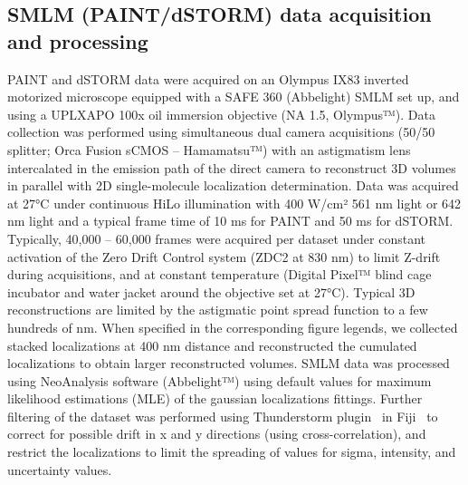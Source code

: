 \subsection{SMLM (PAINT/dSTORM) data acquisition and processing}

PAINT and dSTORM data were acquired on an Olympus IX83 inverted motorized microscope equipped with a SAFE 360 (Abbelight) SMLM set up, and using a UPLXAPO 100x oil immersion objective (NA 1.5, Olympus™).
Data collection was performed using simultaneous dual camera acquisitions (50/50 splitter; Orca Fusion sCMOS -- Hamamatsu™) with an astigmatism lens intercalated in the emission path of the direct camera to reconstruct 3D volumes in parallel with 2D single-molecule localization determination.
Data was acquired at 27°C under continuous HiLo illumination with 400 W/cm² 561 nm light or 642 nm light and a typical frame time of 10 ms for PAINT and 50 ms for dSTORM.
Typically, 40,000 -- 60,000 frames were acquired per dataset under constant activation of the Zero Drift Control system (ZDC2 at 830 nm) to limit Z-drift during acquisitions, and at constant temperature (Digital Pixel™ blind cage incubator and water jacket around the objective set at 27°C).
Typical 3D reconstructions are limited by the astigmatic point spread function to a few hundreds of nm.
When specified in the corresponding figure legends, we collected stacked localizations at 400 nm distance and reconstructed the cumulated localizations to obtain larger reconstructed volumes.
SMLM data was processed using NeoAnalysis software (Abbelight™) using default values for maximum likelihood estimations (MLE) of the gaussian localizations fittings.
Further filtering of the dataset was performed using Thunderstorm plugin~\cite{ovesnyThunderSTORMComprehensiveImageJ2014} in Fiji~\cite{schindelinFijiOpensourcePlatform2012} to correct for possible drift in x and y directions (using cross-correlation), and restrict the localizations to limit the spreading of values for sigma, intensity, and uncertainty values.

